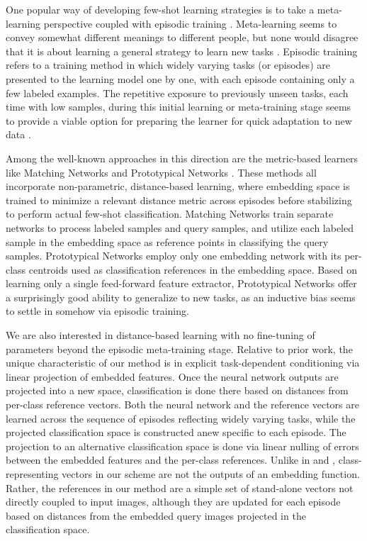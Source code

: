 \documentclass{article}
\begin{document}
One popular way of developing few-shot learning strategies is to take a meta-learning perspective coupled with episodic training \cite{MN,Ravi, survey2}. Meta-learning seems to convey somewhat different meanings to different people, but none would disagree that it is about learning a general strategy to learn new tasks \cite{survey1}. Episodic training refers to a training method in which widely varying tasks (or episodes) are presented to the learning model one by one, with each episode containing only a few labeled examples. The repetitive exposure to previously unseen tasks, each time with low samples, during this initial learning or meta-training stage seems to provide a viable option for preparing the learner for quick adaptation to new data \cite{MN}. 

Among the well-known approaches in this direction are the metric-based learners like Matching Networks \cite{MN} and Prototypical Networks \cite{PN}. These methods all incorporate non-parametric, distance-based learning, where embedding space is trained to 
minimize a relevant distance metric across episodes before stabilizing to perform actual few-shot classification. 
Matching Networks train separate networks to process labeled samples and query samples, and utilize each labeled sample in the embedding space as reference points in classifying the query samples. 
Prototypical Networks employ only one embedding network with its per-class centroids used as classification references 
in the embedding space. 
Based on learning only a single feed-forward feature extractor, Prototypical Networks offer a surprisingly good ability to generalize to new tasks, as an inductive bias seems to settle in somehow via episodic training.  







We are also interested in distance-based learning with no fine-tuning of parameters beyond the episodic meta-training stage. 
Relative to prior work, the unique characteristic of our method is in explicit task-dependent conditioning via linear projection of embedded features. Once the neural network outputs are projected into a new space, classification is done there based on distances from per-class reference vectors. Both the neural network and the reference vectors are learned across the sequence of episodes reflecting widely varying tasks, while the projected classification space is constructed anew specific to each episode. The projection to an alternative classification space is done via linear nulling of errors between the embedded features and the per-class references. Unlike in \cite{MN} and \cite{PN}, class-representing vectors in our scheme are not the outputs of an embedding function. Rather, the references in our method are a simple set of stand-alone vectors not directly coupled to input images, although they are updated for each episode based on distances from the embedded query images projected in the classification space.   
\end{document}
